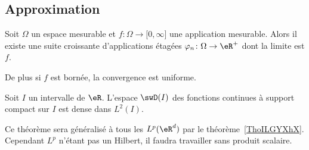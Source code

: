 
\subsection{Approximation}

\begin{lemma}      \label{LempTBaUw}
    Soit \( \Omega\) un espace mesurable et \( f\colon \Omega\to \mathopen[ 0 , \infty \mathclose]\) une application mesurable. Alors il existe une suite croissante d'applications étagées \( \varphi_n\colon \Omega\to \eR^+\) dont la limite est \( f\).

    De plus si \( f\) est bornée, la convergence est uniforme.
\end{lemma}

\begin{theorem}       \label{ThoJsBKir}
    Soit \( I\) un intervalle de \( \eR\). L'espace \( \swD(I)\) des fonctions continues à support compact sur \( I\) est dense dans \( L^2(I)\).
\end{theorem}
Ce théorème sera généralisé à tous les \( L^p(\eR^d)\) par le théorème~\ref{ThoILGYXhX}. Cependant \( L^p\) n'étant pas un Hilbert, il faudra travailler sans produit scalaire.

